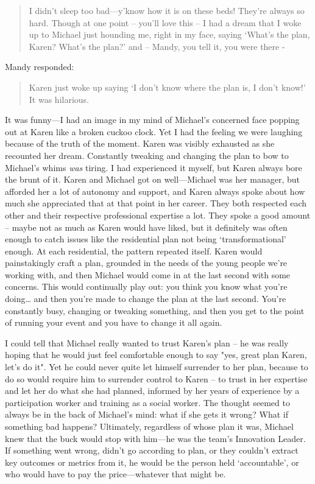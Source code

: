 \begin{quote}
I didn’t sleep too bad—y’know how it is on these beds! They’re always so hard. Though at one point – you’ll love this – I had a dream that I woke up  to Michael just hounding me, right in my face, saying ‘What’s the plan, Karen? What’s the plan?’ and – Mandy, you tell it, you were there -
\end{quote}
Mandy responded:
\begin{quote}
Karen just woke up saying ‘I don’t know where the plan is, I don’t know!’ It was hilarious.
\end{quote}
It was funny—I had an image in my mind of Michael’s concerned face popping out at Karen like a broken cuckoo clock. Yet I had the feeling we were laughing because of the truth of the moment. Karen was visibly exhausted as she recounted her dream. Constantly tweaking and changing the plan to bow to Michael’s whims \emph{was} tiring. I had experienced it myself, but Karen always bore the brunt of it. Karen and Michael got on well—Michael was her manager, but afforded her a lot of autonomy and support, and Karen always spoke about how much she appreciated that at that point in her career. They both respected each other and their respective professional expertise a lot. They spoke a good amount – maybe not as much as Karen would have liked, but it definitely was often enough to catch issues like the residential plan not being `transformational' enough. At each residential, the pattern repeated itself. Karen would painstakingly craft a plan, grounded in the needs of the young people we’re working with, and then Michael would come in at the last second with some concerns. This would continually play out: you think you know what you’re doing… and then you’re made to change the plan at the last second. You’re constantly busy, changing or tweaking something, and then you get to the point of running your event and you have to change it all again. 

I could tell that Michael really wanted to trust Karen’s plan – he was really hoping that he would just feel comfortable enough to say "yes, great plan Karen, let’s do it". Yet he could never quite let himself surrender to her plan, because to do so would require him to surrender control to Karen – to trust in her expertise and let her do what she had planned, informed by her years of experience by a participation worker and training as a social worker. The thought seemed to always be in the back of Michael’s mind: what if she gets it wrong? What if something bad happens? Ultimately, regardless of whose plan it was, Michael knew that the buck would stop with him—he was the team's Innovation Leader.  If something went wrong, didn’t go according to plan, or they couldn’t extract key outcomes or metrics from it, he would be the person held `accountable', or who would have to pay the price—whatever that might be. 

